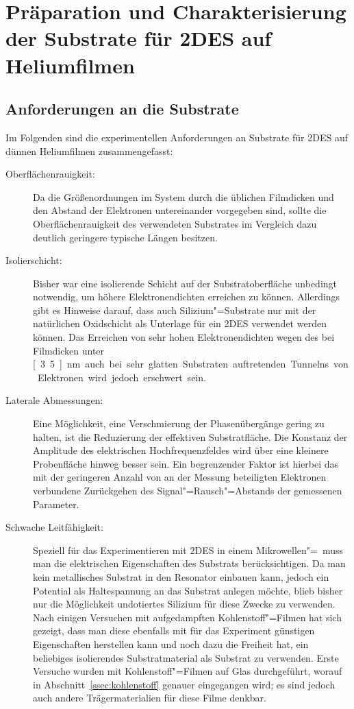 \section{Präparation und Charakterisierung der Substrate für 2DES auf Heliumfilmen}

\subsection{Anforderungen an die Substrate}

Im Folgenden sind die experimentellen Anforderungen an Substrate für 2DES auf dünnen Heliumfilmen zusammengefasst:
\begin{description}
	\item[Oberflächenrauigkeit:] Da die Größenordnungen im System durch die üblichen Filmdicken und den Abstand der Elektronen untereinander vorgegeben sind, sollte die Oberflächenrauigkeit des verwendeten Substrates im Vergleich dazu deutlich geringere typische Längen besitzen.
	\item[Isolierschicht:] Bisher war eine isolierende Schicht auf der Substratoberfläche unbedingt notwendig, um höhere Elektronendichten erreichen zu können. Allerdings gibt es Hinweise darauf, dass auch Silizium"=Substrate nur mit der natürlichen Oxidschicht als Unterlage für ein 2DES verwendet werden können. Das Erreichen von sehr hohen Elektronendichten wegen des bei Filmdicken unter \unit[3.5]{nm} auch bei sehr glatten Substraten auftretenden Tunnelns von Elektronen wird jedoch erschwert sein.
	\item[Laterale Abmessungen:] Eine Möglichkeit, eine Verschmierung der Phasenübergänge gering zu halten, ist die Reduzierung der effektiven Substratfläche. Die Konstanz der Amplitude des elektrischen Hochfrequenzfeldes wird über eine kleinere Probenfläche hinweg besser sein. Ein begrenzender Faktor ist hierbei das mit der geringeren Anzahl von an der Messung beteiligten Elektronen verbundene Zurückgehen des Signal"=Rausch"=Abstands der gemessenen Parameter. 
	\item[Schwache Leitfähigkeit:]
Speziell für das Experimentieren mit 2DES in einem Mikrowellen"=\HR\ muss man die elektrischen Eigenschaften des Substrats berücksichtigen. Da man kein metallisches Substrat in den Resonator einbauen kann, jedoch ein Potential als Haltespannung an das Substrat anlegen möchte, blieb bisher nur die Möglichkeit undotiertes Silizium für diese Zwecke zu verwenden. Nach einigen Versuchen mit aufgedampften Kohlenstoff"=Filmen hat sich gezeigt, dass man diese ebenfalls mit für das Experiment günstigen Eigenschaften herstellen kann und noch dazu die Freiheit hat, ein beliebiges isolierendes Substratmaterial als Substrat zu verwenden. Erste Versuche wurden mit Kohlenstoff"=Filmen auf Glas durchgeführt, worauf in Abschnitt~\ref{ssec:kohlenstoff} genauer eingegangen wird; es sind jedoch auch andere Trägermaterialien für diese Filme denkbar.
\end{description}

